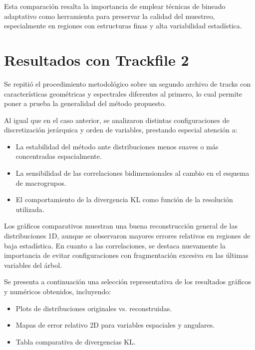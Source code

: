 Esta comparación resalta la importancia de emplear técnicas de bineado adaptativo como herramienta para preservar la calidad del muestreo, especialmente en regiones con estructuras finas y alta variabilidad estadística.

\section{Resultados con Trackfile 2}
\label{sec:resultados-track2}

Se repitió el procedimiento metodológico sobre un segundo archivo de tracks con características geométricas y espectrales diferentes al primero, lo cual permite poner a prueba la generalidad del método propuesto.

Al igual que en el caso anterior, se analizaron distintas configuraciones de discretización jerárquica y orden de variables, prestando especial atención a:

\begin{itemize}
    \item La estabilidad del método ante distribuciones menos suaves o más concentradas espacialmente.
    \item La sensibilidad de las correlaciones bidimensionales al cambio en el esquema de macrogrupos.
    \item El comportamiento de la divergencia KL como función de la resolución utilizada.
\end{itemize}

Los gráficos comparativos muestran una buena reconstrucción general de las distribuciones 1D, aunque se observaron mayores errores relativos en regiones de baja estadística. En cuanto a las correlaciones, se destaca nuevamente la importancia de evitar configuraciones con fragmentación excesiva en las últimas variables del árbol.

Se presenta a continuación una selección representativa de los resultados gráficos y numéricos obtenidos, incluyendo:

\begin{itemize}
    \item Plots de distribuciones originales vs. reconstruidas.
    \item Mapas de error relativo 2D para variables espaciales y angulares.
    \item Tabla comparativa de divergencias KL.
\end{itemize}


